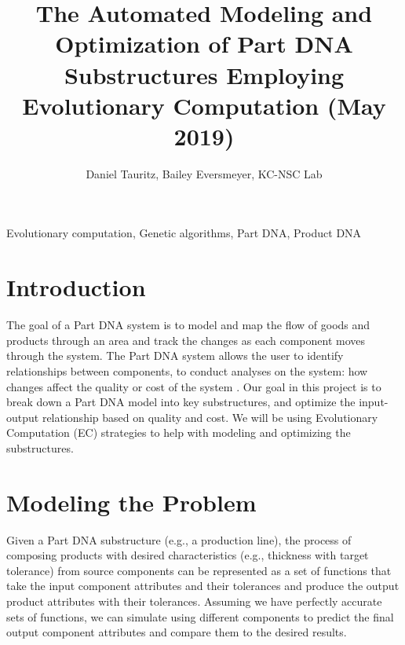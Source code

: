 \documentclass{IEEEtran}
\begin{document}
\title{The Automated Modeling and Optimization of Part DNA Substructures Employing Evolutionary Computation (May 2019)}
\author{Daniel Tauritz, Bailey Eversmeyer, KC-NSC Lab}

\maketitle

\begin{abstract}

\end{abstract}

\begin{IEEEkeywords}
Evolutionary computation, Genetic algorithms, Part DNA, Product DNA
\end{IEEEkeywords}

\section{Introduction}
The goal of a Part DNA system is to model and map the flow of goods and products through an area and track the changes as each component moves through the system. The Part DNA system allows the user to identify relationships between components, to conduct analyses on the system: how changes affect the quality or cost of the system \cite{b1}. Our goal in this project is to break down a Part DNA model into key substructures, and optimize the input-output relationship based on quality and cost. We will be using Evolutionary Computation (EC) strategies to help with modeling and optimizing the substructures.

\section{Modeling the Problem}
Given a Part DNA substructure (e.g., a production line), the process of composing products with desired characteristics (e.g., thickness with target tolerance) from source components can be represented as a set of functions that take the input component attributes and their tolerances and produce the output product attributes with their tolerances. Assuming we have perfectly accurate sets of functions, we can simulate using different components to predict the final output component attributes and compare them to the desired results.
\end{document}

